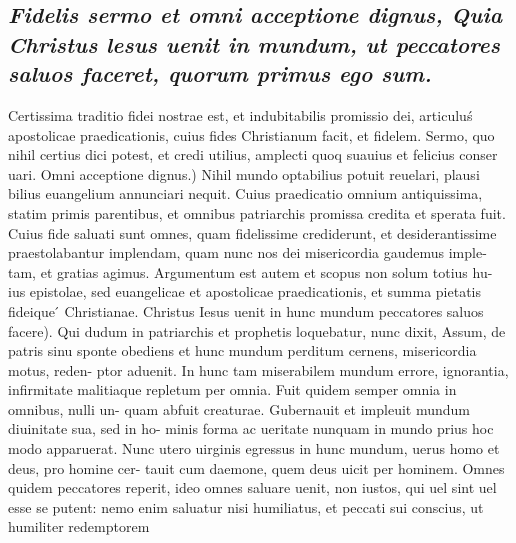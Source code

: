 \documentclass{article}
\begin{document}
\begin{pages}
\subsection*{\textit{Fidelis sermo et omni acceptione dignus, Quia Christus lesus uenit in mundum, ut peccatores saluos faceret, quorum primus ego sum. }}\pstart Certissima traditio fidei nostrae est, et indubitabilis promissio dei, articuluś apostolicae praedicationis, cuius fides Christianum facit, et fidelem. Sermo, quo nihil certius dici potest, et credi utilius, amplecti quoq suauius et felicius conser uari. Omni acceptione dignus.) Nihil mundo optabilius potuit reuelari, plausi bilius euangelium annunciari nequit. Cuius praedicatio omnium antiquissima, statim primis parentibus, et omnibus patriarchis promissa credita et sperata fuit. Cuius fide saluati sunt omnes, quam fidelissime crediderunt, et desiderantissime praestolabantur implendam, quam nunc nos dei misericordia gaudemus imple- tam, et gratias agimus. Argumentum est autem et scopus non solum totius hu- ius epistolae, sed euangelicae et apostolicae praedicationis, et summa pietatis fideique ́ Christianae. Christus Iesus uenit in hunc mundum peccatores saluos facere). Qui dudum in patriarchis et prophetis loquebatur, nunc dixit, Assum, de patris sinu sponte obediens et hunc mundum perditum cernens, misericordia motus, reden- ptor aduenit. In hunc tam miserabilem mundum errore, ignorantia, infirmitate malitiaque repletum per omnia. Fuit quidem semper omnia in omnibus, nulli un- quam abfuit creaturae. Gubernauit et impleuit mundum diuinitate sua, sed in ho- minis forma ac ueritate nunquam in mundo prius hoc modo apparuerat. Nunc utero uirginis egressus in hunc mundum, uerus homo et deus, pro homine cer- tauit cum daemone, quem deus uicit per hominem. Omnes quidem peccatores reperit, ideo omnes saluare uenit, non iustos, qui uel sint uel esse se putent: nemo enim saluatur nisi humiliatus, et peccati sui conscius, ut humiliter redemptorem  \pend

\end{pages}
\end{document}
